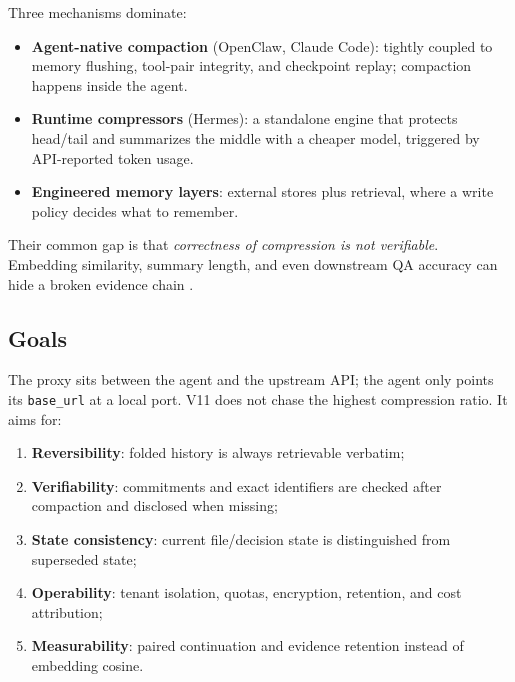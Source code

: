 \documentclass[11pt,a4paper]{article}
\begin{document}
Three mechanisms dominate:
\begin{itemize}
  \item \textbf{Agent-native compaction} (OpenClaw, Claude Code): tightly coupled to memory flushing, tool-pair integrity, and checkpoint replay; compaction happens inside the agent.
  \item \textbf{Runtime compressors} (Hermes): a standalone engine that protects head/tail and summarizes the middle with a cheaper model, triggered by API-reported token usage.
  \item \textbf{Engineered memory layers}: external stores plus retrieval, where a write policy decides what to remember.
\end{itemize}

Their common gap is that \emph{correctness of compression is not verifiable}. Embedding similarity, summary length, and even downstream QA accuracy can hide a broken evidence chain \cite{keepbench,compactbench}.

\subsection{Goals}
The proxy sits between the agent and the upstream API; the agent only points its \texttt{base\_url} at a local port. V11 does not chase the highest compression ratio. It aims for:
\begin{enumerate}
  \item \textbf{Reversibility}: folded history is always retrievable verbatim;
  \item \textbf{Verifiability}: commitments and exact identifiers are checked after compaction and disclosed when missing;
  \item \textbf{State consistency}: current file/decision state is distinguished from superseded state;
  \item \textbf{Operability}: tenant isolation, quotas, encryption, retention, and cost attribution;
  \item \textbf{Measurability}: paired continuation and evidence retention instead of embedding cosine.
\end{enumerate}
\end{document}
